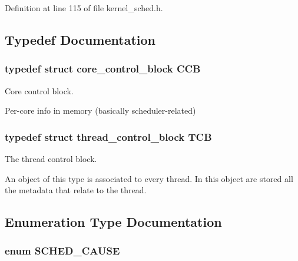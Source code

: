 Definition at line 115 of file kernel\+\_\+sched.\+h.



\subsection{Typedef Documentation}
\subsubsection[{\texorpdfstring{C\+CB}{CCB}}]{\setlength{\rightskip}{0pt plus 5cm}typedef struct {\bf core\+\_\+control\+\_\+block}  {\bf C\+CB}}\hypertarget{group__scheduler_ga7485b31e0dd9fd723bc2d75fba5206a0}{}\label{group__scheduler_ga7485b31e0dd9fd723bc2d75fba5206a0}


Core control block. 

Per-\/core info in memory (basically scheduler-\/related) 
\subsubsection[{\texorpdfstring{T\+CB}{TCB}}]{\setlength{\rightskip}{0pt plus 5cm}typedef struct {\bf thread\+\_\+control\+\_\+block}  {\bf T\+CB}}\hypertarget{group__scheduler_gaf88d9c946bf70b36a1e8bc34383abfc9}{}\label{group__scheduler_gaf88d9c946bf70b36a1e8bc34383abfc9}


The thread control block. 

An object of this type is associated to every thread. In this object are stored all the metadata that relate to the thread. 

\subsection{Enumeration Type Documentation}
\subsubsection[{\texorpdfstring{S\+C\+H\+E\+D\+\_\+\+C\+A\+U\+SE}{SCHED_CAUSE}}]{\setlength{\rightskip}{0pt plus 5cm}enum {\bf S\+C\+H\+E\+D\+\_\+\+C\+A\+U\+SE}}\hypertarget{group__scheduler_gaad787d8d80312ffca3c0f197b3a25fbe}{}\label{group__scheduler_gaad787d8d80312ffca3c0f197b3a25fbe}


